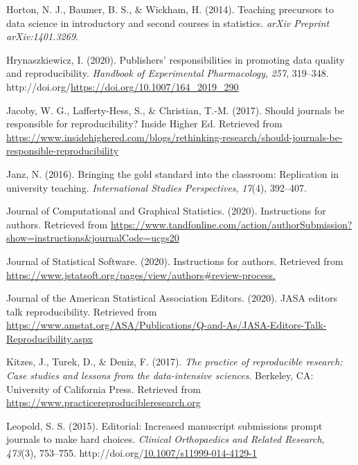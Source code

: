 \documentclass[12pt,twoside]{reedthesis}
\newenvironment{CSLReferences}%
  {}%
  {\par}
\begin{document}
\begin{CSLReferences}{1}{0}
\leavevmode\hypertarget{ref-horton2014teaching}{}%
Horton, N. J., Baumer, B. S., \& Wickham, H. (2014). Teaching precursors to data science in introductory and second courses in statistics. \emph{arXiv Preprint arXiv:1401.3269}.

\leavevmode\hypertarget{ref-hrynaszkiewicz2020publishers}{}%
Hrynaszkiewicz, I. (2020). Publishers' responsibilities in promoting data quality and reproducibility. \emph{Handbook of Experimental Pharmacology}, \emph{257}, 319--348. http://doi.org/\url{https://doi.org/10.1007/164_2019_290}

\leavevmode\hypertarget{ref-higher-ed}{}%
Jacoby, W. G., Lafferty-Hess, S., \& Christian, T.-M. (2017). Should journals be responsible for reproducibility? Inside Higher Ed. Retrieved from \url{https://www.insidehighered.com/blogs/rethinking-research/should-journals-be-responsible-reproducibility}

\leavevmode\hypertarget{ref-janz2016bringing}{}%
Janz, N. (2016). Bringing the gold standard into the classroom: Replication in university teaching. \emph{International Studies Perspectives}, \emph{17}(4), 392--407.

\leavevmode\hypertarget{ref-jcgs-guide}{}%
Journal of Computational and Graphical Statistics. (2020). Instructions for authors. Retrieved from \url{https://www.tandfonline.com/action/authorSubmission?show=instructions\&journalCode=ucgs20}

\leavevmode\hypertarget{ref-jss-guide}{}%
Journal of Statistical Software. (2020). Instructions for authors. Retrieved from \url{https://www.jstatsoft.org/pages/view/authors\#review-process.}

\leavevmode\hypertarget{ref-jasa-rep-editors}{}%
Journal of the American Statistical Association Editors. (2020). JASA editors talk reproducibility. Retrieved from \url{https://www.amstat.org/ASA/Publications/Q-and-As/JASA-Editors-Talk-Reproducibility.aspx}

\leavevmode\hypertarget{ref-kitzes2017practice}{}%
Kitzes, J., Turek, D., \& Deniz, F. (2017). \emph{The practice of reproducible research: Case studies and lessons from the data-intensive sciences}. Berkeley, CA: University of California Press. Retrieved from \url{https://www.practicereproducibleresearch.org}

\leavevmode\hypertarget{ref-leopold2015increased}{}%
Leopold, S. S. (2015). Editorial: Increased manuscript submissions prompt journals to make hard choices. \emph{Clinical Orthopaedics and Related Research}, \emph{473}(3), 753--755. http://doi.org/\href{https://doi.org/10.1007/s11999-014-4129-1}{10.1007/s11999-014-4129-1}


\end{CSLReferences}
\end{document}
